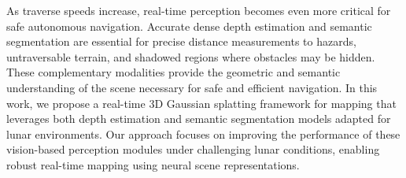 As traverse speeds increase, real-time perception becomes even more critical for safe autonomous navigation. Accurate dense depth estimation and semantic segmentation are essential for precise distance measurements to hazards, untraversable terrain, and shadowed regions where obstacles may be hidden. These complementary modalities provide the geometric and semantic understanding of the scene necessary for safe and efficient navigation.
In this work, we propose a real-time 3D Gaussian splatting framework for mapping that leverages both depth estimation and semantic segmentation models adapted for lunar environments. Our approach focuses on improving the performance of these vision-based perception modules under challenging lunar conditions, enabling robust real-time mapping using neural scene representations.

